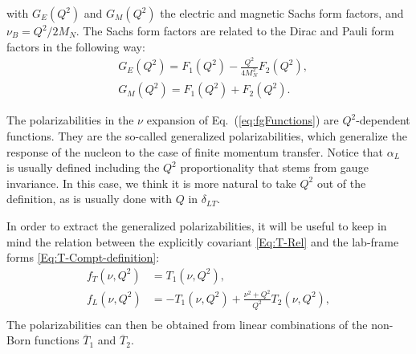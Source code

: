 \documentclass[11pt,preprint,tightenlines,
showpacs,preprintnumbers,amsmath,amssymb,superscriptaddress,a4paper,nofootinbib]{revtex4-1}
\def\Eqref#1{Eq.~(\ref{eq:#1})}
\def\ol#1{\overline{#1}}
\begin{document}
with $G_E(Q^2)$ and $G_M(Q^2)$ the electric and magnetic Sachs form factors, and $\nu_B=Q^2/2M_N$. 
The Sachs form factors are related to the Dirac and Pauli form factors in the following way:
\begin{subequations}
\begin{align}
& G_E(Q^2)=F_1(Q^2) - \frac{Q^2}{4M_N^2} F_2(Q^2),\\
& G_M(Q^2)=F_1(Q^2) + F_2(Q^2).
\end{align}
\end{subequations}


The polarizabilities in the  $\nu$ expansion of \Eqref{fgFunctions} are $Q^2$-dependent functions.
They  are the so-called generalized polarizabilities, which generalize the response of the nucleon to the case of finite momentum transfer. Notice that $\alpha_L$ is usually defined including the $Q^2$ proportionality that stems from gauge invariance. 
In this case, we think it is more natural to take $Q^2$ out of the definition, as is usually done with $Q$ in $\delta_{LT}$.



In order to extract the generalized polarizabilities, it will be useful to keep in mind the relation between the explicitly covariant \eqref{Eq:T-Rel} and the lab-frame forms \eqref{Eq:T-Compt-definition}:
\begin{subequations}
\begin{align}
  f_T(\nu,Q^2) &= T_1(\nu,Q^2), \label{Eq:fT-T1}\\
  f_L(\nu,Q^2) &= - T_1(\nu,Q^2) +  \frac{\nu^2 + Q^2}{Q^2} T_2(\nu,Q^2), \label{Eq:fL-T1T2}\\
\end{align} 
\end{subequations}
The polarizabilities can then be obtained from linear combinations of the non-Born functions $\ol T_1$ and $\ol T_2$. 


\end{document}
